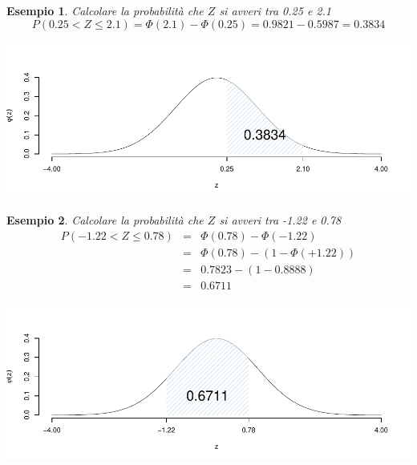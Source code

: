\documentclass[
  11pt,
]{book}
\theoremstyle{mytheoremstyle}
\theoremstyle{mydefstyle}
\newtheorem{example}{{Esempio}}[section]
\begin{document}
\begin{example}

Calcolare la probabilità che \(Z\) si avveri tra 0.25 e 2.1
\[P(0.25< Z \leq 2.1) = \Phi(2.1)-\Phi(0.25)=0.9821-0.5987=0.3834\]

\begin{center}\includegraphics{Appunti_di_Statistica_2025_files/figure-latex/07c-Normale-21,-1} \end{center}

\end{example}

\begin{example}

Calcolare la probabilità che \(Z\) si avveri tra -1.22 e 0.78
\begin{eqnarray*}
P(-1.22< Z \leq 0.78) &=& \Phi(0.78)-\Phi(-1.22) \\
                         &=& \Phi(0.78)-(1-\Phi(+1.22)) \\
                         &=& 0.7823-(1-0.8888)\\
                         &=& 0.6711
\end{eqnarray*}

\begin{center}\includegraphics{Appunti_di_Statistica_2025_files/figure-latex/07c-Normale-23,-1} \end{center}

\end{example}
\end{document}
